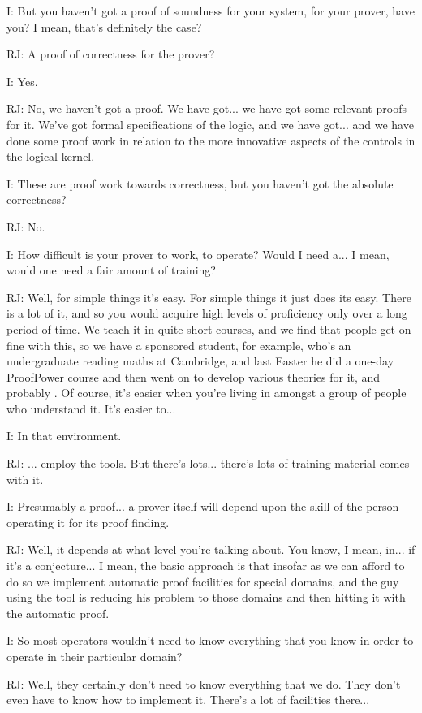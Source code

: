 \documentclass[10pt,titlepage]{book}
\begin{document}
I: But you haven't got a proof of soundness for your system, for your prover, have you?
I mean, that's definitely the case?

RJ: A proof of correctness for the prover?

I: Yes.

RJ: No, we haven't got a proof.
We have got... we have got some relevant proofs for it.
We've got formal specifications of the logic, and we have got... and we have done some proof work in relation to the more innovative aspects of the controls in the logical kernel.

I: These are proof work towards correctness, but you haven't got the absolute correctness?

RJ: No.

I: How difficult is your prover to work, to operate?
Would I need a... I mean, would one need a fair amount of training?

RJ: Well, for simple things it's easy.
For simple things it just does its easy.
There is a lot of it, and so you would acquire high levels of proficiency only over a long period of time.
We teach it in quite short courses, and we find that people get on fine with this, so we have a sponsored student, for example, who's an undergraduate reading maths at Cambridge, and last Easter he did a one-day ProofPower course and then went on to develop various theories for it, and probably 	.
Of course, it's easier when you're living in amongst a group of people who understand it.
It's easier to...

I: In that environment.

RJ: ... employ the tools.
But there's lots... there's lots of training material comes with it.

I: Presumably a proof... a prover itself will depend upon the skill of the person operating it for its proof finding.

RJ: Well, it depends at what level you're talking about.
You know, I mean, in... if it's a conjecture... I mean, the basic approach is that insofar as we can afford to do so we implement automatic proof facilities for special domains, and the guy using the tool is reducing his problem to those domains and then hitting it with the automatic proof.

I: So most operators wouldn't need to know everything that you know in order to operate in their particular domain?

RJ: Well, they certainly don't need to know everything that we do.
They don't even have to know how to implement it.
There's a lot of facilities there...
\end{document}
